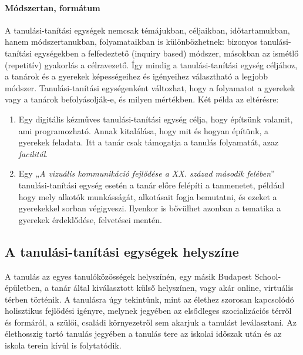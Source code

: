 \hypertarget{modszertan-formatum}{%
\paragraph{Módszertan, formátum}\label{modszertan-formatum}}

A tanulási-tanítási egységek nemcsak témájukban, céljaikban,
időtartamukban, hanem módszertanukban, folyamataikban is különbözhetnek:
bizonyos tanulási-tanítási egységekben a felfedeztető (inquiry based)
módszer, másokban az ismétlő (repetitív) gyakorlás a célravezető. Így
mindig a tanulási-tanítási egység céljához, a tanárok és a gyerekek
képességeihez és igényeihez választható a legjobb módszer.
Tanulási-tanítási egységenként változhat, hogy a folyamatot a gyerekek
vagy a tanárok befolyásolják-e, és milyen mértékben. Két példa az
eltérésre:

\begin{enumerate}
\def\labelenumi{\arabic{enumi}.}
\item
  Egy digitális kézműves tanulási-tanítási egység célja, hogy építsünk
  valamit, ami programozható. Annak kitalálása, hogy mit és hogyan
  építünk, a gyerekek feladata. Itt a tanár csak támogatja a tanulás
  folyamatát, azaz \emph{facilitál}.
\item
  Egy „\emph{A vizuális kommunikáció fejlődése a XX. század második
  felében}'' tanulási-tanítási egység esetén a tanár előre felépíti a
  tanmenetet, például hogy mely alkotók munkásságát, alkotásait fogja
  bemutatni, és ezeket a gyerekekkel sorban végigveszi. Ilyenkor is
  bővülhet azonban a tematika a gyerekek érdeklődése, felvetései mentén.
\end{enumerate}

\hypertarget{a-tanulasi-tanitasi-egysegek-helyszine}{%
\subsection{A tanulási-tanítási egységek
helyszíne}\label{a-tanulasi-tanitasi-egysegek-helyszine}}

A tanulás az egyes tanulóközösségek helyszínén, egy másik Budapest\break
School-épületben, a tanár által kiválasztott külső helyszínen, vagy akár
online, virtuális térben történik. A tanulásra úgy tekintünk, mint az
élethez szorosan kapcsolódó holisztikus fejlődési igényre, melynek
jegyében az elsődleges szocializációs térről és formáról, a szülői,
családi környezetről sem akarjuk a tanulást leválasztani. Az élethosszig
tartó tanulás jegyében a tanulás tere az iskolai időszak után és az
iskola terein kívül is folytatódik.


